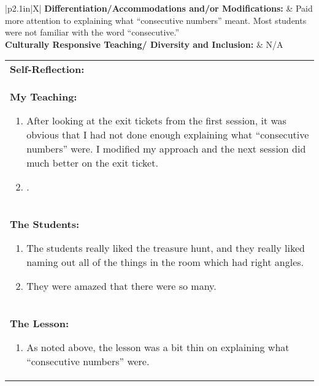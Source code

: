 \vskip 6pt

\begin{small}
\begin{tabularx}{\linewidth}{|p{2.1in}|X|}
  \hline
  \textbf{Differentiation/Accommodations and/or Modifications: } & Paid more attention to explaining what ``consecutive numbers'' meant.   Most students were not familiar with the word ``consecutive.''\\
  \hline
  \textbf{Culturally Responsive Teaching/ Diversity and Inclusion: } & N/A\\
  \hline
\end{tabularx}

\vskip 6pt

\begin{tabularx}{\linewidth}{|X|}
  \hline
  \textbf{Self-Reflection:} \\
  \textbf{My Teaching:} 
  \begin{enumerate}
  \item After looking at the exit tickets from the first session, it was obvious that I had not done enough explaining what ``consecutive numbers'' were.   I modified my approach and the next session did much better on the exit ticket.
  \item .
  \end{enumerate} \\
  
  \textbf{The Students:}
  \begin{enumerate}
  \item The students really liked the treasure hunt, and they really liked naming out all of the things in the room which had right angles.  
  \item They were amazed that there were so many.  
  \end{enumerate} \\
  
  \textbf{The Lesson:}
  \begin{enumerate}
  \item As noted above, the lesson was a bit thin on explaining what ``consecutive numbers'' were.  
  \end{enumerate} \\
  
  \hline
\end{tabularx}
\end{small}
